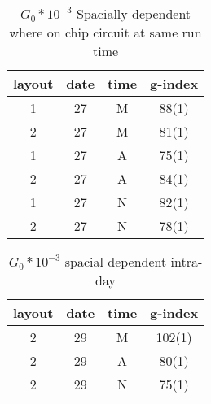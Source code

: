 \documentclass[main.tex]{subfiles}
\begin{document}
\begin{table}
\begin{tabular}{cccc}
layout & date & time & g-index\\\hline
1 & 27 & M & 88(1)\\
2 & 27 & M & 81(1)\\
1 & 27 & A & 75(1)\\
2 & 27 & A & 84(1)\\
1 & 27 & N & 82(1)\\
2 & 27 & N & 78(1)\\
\end{tabular}
\caption{$G_0 * 10^{-3}$ Spacially dependent where on chip circuit at same run time}
\end{table}

\begin{table}
\begin{tabular}{cccc}
layout & date & time & g-index\\\hline
2 & 29 & M & 102(1)\\
2 & 29 & A & 80(1)\\
2 & 29 & N & 75(1)\\
\end{tabular}
\caption{$G_0 * 10^{-3}$ spacial dependent intra-day }
\end{table}
\end{document}
